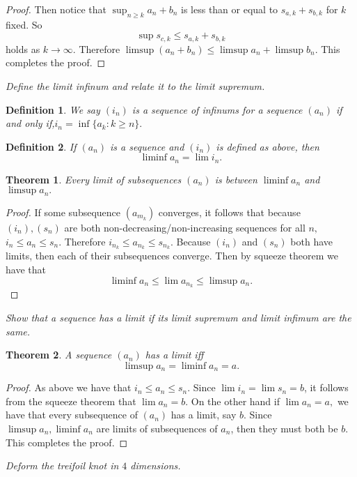 \documentclass[letter]{article}
\newtheorem{theorem}{Theorem}
\newtheorem{definition}{Definition}
\newenvironment{menumerate}{%
  \edef\backupindent{\the\parindent}%
  \enumerate%
  \setlength{\parindent}{\backupindent}%
}{\endenumerate}
\begin{document}
\begin{menumerate}
\begin{menumerate}
\begin{proof}
			    Then notice that $\sup_{n\geq k} a_n +b_n$ is less than or
			    equal to $  s_{a,k} + s_{b,k}$ for $k$ fixed. 
			    So
			    \begin{equation}
			    \sup s_{c,k} \leq  s_{a,k} +  s_{b,k}
			    \end{equation}
			    holds as $k\to \infty$. Therefore $\limsup{(a_n + b_n)} \leq \limsup{a_n} + \limsup{b_n}$.
			    This completes the proof.
			    \end{proof}
				\newpage
			\item \textit{Define the limit infinum and relate it to the limit supremum.}
				\begin{definition} We say $(i_{n})$ is a sequence of infinums for a sequence $(a_n)$ if and only if,$ i_n = \inf\{a_k : k \geq n\}.$ 
	 			\end{definition}
	 			\begin{definition} If $(a_n)$ is a sequence and $(i_n)$ is defined as above, then
	 			$$\liminf a_n = \lim i_n.$$
	 			\end{definition}

	 			\begin{theorem}
	 				Every limit of subsequences $(a_n)$ is between $\liminf a_n$ and $\limsup a_n.$
	 			\end{theorem}
	 			\begin{proof}
	 				If some subsequence $(a_{m_k})$ converges, it follows that because $(i_n), (s_n)$ are both non-decreasing/non-increasing sequences for all $n,$ $i_n \leq a_n \leq s_n.$ Therefore $i_{n_k} \leq a_{n_k} \leq s_{n_k}.$ Because $(i_n)$ and $(s_n)$ both have limits, then each of their subsequences converge. Then by squeeze theorem we have that $$\liminf a_n \leq \lim a_{n_k} \leq \limsup {a_n}.$$ 
	 			\end{proof}


			\item \textit{Show that a sequence has a limit if its limit supremum and limit infimum are the same.}
				\begin{theorem}
				 	A sequence $(a_n)$ has a limit iff $$\limsup a_n = \liminf a_n = a.$$
				 \end{theorem} 
			 	\begin{proof}
			 	 As above we have that $i_n \leq a_n \leq s_n.$ Since $\lim i_n = \lim s_n = b$, it follows from the squeeze theorem that $\lim a_n = b.$
			 	 On the other hand if $\lim a_n = a,$ we have that every subsequence of $(a_n)$ has a limit, say $b$. Since $\limsup a_n, \liminf a_n$ are limits of subsequences of $a_n$, then they must both be $b.$ This completes the proof.
			 	\end{proof}
			\end{menumerate}

			\newpage
			\setcounter{enumi}{47}
			\item \textit{Deform the treifoil knot in $4$ dimensions.} 



		
		
\end{menumerate}
\end{document}
